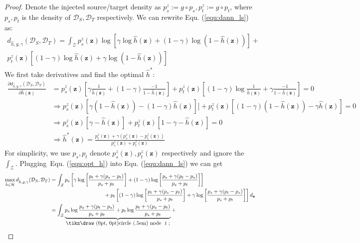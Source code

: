 \documentclass{article} \usepackage{iclr2023_conference,times}
\newcommand{\myref}[1]{Equ. (\ref{#1})}
\newcommand{\z}{\mathbf{z}}
\newcommand{\D}{\mathcal{D}}
\newcommand*{\circled}[1]{\lower.7ex\hbox{\tikz\draw (0pt, 0pt)circle (.5em) node {\makebox[1em][c]{\small #1}};}}
\begin{document}
\begin{proof}
Denote the injected source/target density as $p_s^z:=g\circ  p_s,p_t^z:=g\circ  p_t$, where $p_s,p_t$ is the density of $\D_S,\D_T$ respectively.
We can rewrite \myref{equ:dann_ls} as:
\begin{equation}
\begin{aligned}
d_{\hat{h},g,\gamma}(\D_S,\D_T)=\int_{\mathcal{Z}}p^z_s(\z)\log \left[\gamma\log \hat{h}(\z)+(1-\gamma)\log\left(1-\hat{h}(\z)\right) \right]+\\
p_t^z(\z) \left[(1-\gamma)\log \hat{h}(\z)+\gamma\log\left(1-\hat{h}(\z)\right) \right]
\end{aligned}
\end{equation}
We first take derivatives and find the optimal $\hat{h}^*$:
\begin{equation}
\begin{aligned}
\frac{\partial d_{\hat{h},g,\gamma}(\D_S,\D_T)}{\partial \hat{h}(\z)}&=p^z_s(\z) \left[\gamma\frac{1}{\hat{h}(\z)}+(1-\gamma)\frac{-1}{1-\hat{h}(\z)} \right]+p_t^z(\z) \left[(1-\gamma)\log \frac{1}{\hat{h}(\z)}+\gamma\frac{-1}{1-\hat{h}(\z)} \right]=0\\
&\Rightarrow p_s^z(\z)\left[\gamma(1-\hat{h}(\z))-(1-\gamma)\hat{h}(\z)\right]]+p_t^z(\z)\left[(1-\gamma)(1-\hat{h}(\z))-\gamma\hat{h}(\z)\right]=0\\
&\Rightarrow p_s^z(\z)\left[\gamma-\hat{h}(\z)\right]+p_t^z(\z)\left[1-\gamma-\hat{h}(\z)\right]=0\\
&\Rightarrow \hat{h}^*(\z)=\frac{p_t^z(\z)+\gamma(p_s^z(\z)-p_t^z(\z))}{p_s^z(\z)+p_t^z(\z)}
\end{aligned}\label{equ:opt_h}
\end{equation}
For simplicity, we use $p_s,p_t$ denote $p_s^z(\z),p_t^z(\z)$ respectively and ignore the $\int_{\mathcal{Z}}$. Plugging~\myref{equ:opt_h} into \myref{equ:dann_ls} we can get
\begin{equation}
\begin{aligned}
\max_{\hat{h}\in\hat{\mathcal{H}}} d_{\hat{h},g,\gamma}(\D_S,\D_T)&=\int_{\mathcal{Z}} p_s\left[\gamma\log\left[ \frac{p_t+\gamma(p_s-p_t)}{p_s+p_t}\right] + (1-\gamma)\log\left[\frac{p_s+\gamma(p_t-p_s)}{p_s+p_t}\right]\right]\\
&\quad\quad\quad\quad\quad\quad\quad\quad\quad\quad+ p_t\left[(1-\gamma)\log\left[ \frac{p_t+\gamma(p_s-p_t)}{p_s+p_t}\right] + \gamma\log\left[\frac{p_s+\gamma(p_t-p_s)}{p_s+p_t}\right]\right] d_\z\\
&=\int_{\mathcal{Z}} \underbrace{p_s\log\frac{p_s+\gamma(p_t-p_s)}{p_s+p_t}+p_t\log\frac{p_t+\gamma(p_s-p_t)}{p_s+p_t}}_{\rm \circled{\rm 1}}+\\

\end{aligned}
\end{equation}
\end{proof}
\end{document}
